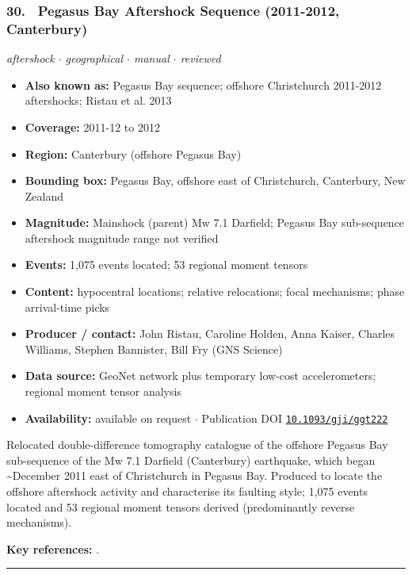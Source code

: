 \documentclass[10pt,a4paper]{article}
\newcommand{\catentryrule}{\par\vspace{3pt}\noindent\textcolor{rulegrey}{\rule{\linewidth}{0.3pt}}\par\vspace{5pt}}
\newcommand{\kv}[2]{\item \textbf{#1:} #2}
\begin{document}
\subsubsection*{\hypertarget{c:30}{30.}~ Pegasus Bay Aftershock Sequence (2011-2012, Canterbury)}
{\small\itshape aftershock $\cdot$ geographical $\cdot$ manual $\cdot$ reviewed}\par\vspace{2pt}
\begin{itemize}[leftmargin=1.3em,itemsep=0.6pt,topsep=1pt,parsep=0pt]
\kv{Also known as}{Pegasus Bay sequence; offshore Christchurch 2011-2012 aftershocks; Ristau et al. 2013}
\kv{Coverage}{2011-12 to 2012}
\kv{Region}{Canterbury (offshore Pegasus Bay)}
\kv{Bounding box}{Pegasus Bay, offshore east of Christchurch, Canterbury, New Zealand}
\kv{Magnitude}{Mainshock (parent) Mw 7.1 Darfield; Pegasus Bay sub-sequence aftershock magnitude range not verified}
\kv{Events}{1,075 events located; 53 regional moment tensors}
\kv{Content}{hypocentral locations; relative relocations; focal mechanisms; phase arrival-time picks}
\kv{Producer / contact}{John Ristau, Caroline Holden, Anna Kaiser, Charles Williams, Stephen Bannister, Bill Fry (GNS Science)}
\kv{Data source}{GeoNet network plus temporary low-cost accelerometers; regional moment tensor analysis}
\kv{Availability}{available on request $\cdot$ Publication DOI \href{https://doi.org/10.1093/gji/ggt222}{\nolinkurl{10.1093/gji/ggt222}}}
\end{itemize}
\par\vspace{2pt}Relocated double-difference tomography catalogue of the offshore Pegasus Bay sub-sequence of the Mw 7.1 Darfield (Canterbury) earthquake, which began \textasciitilde{}December 2011 east of Christchurch in Pegasus Bay. Produced to locate the offshore aftershock activity and characterise its faulting style; 1,075 events located and 53 regional moment tensors derived (predominantly reverse mechanisms).
\par\vspace{2pt}\textbf{Key references:} \cite{Ristau2013}.
\catentryrule
\end{document}
